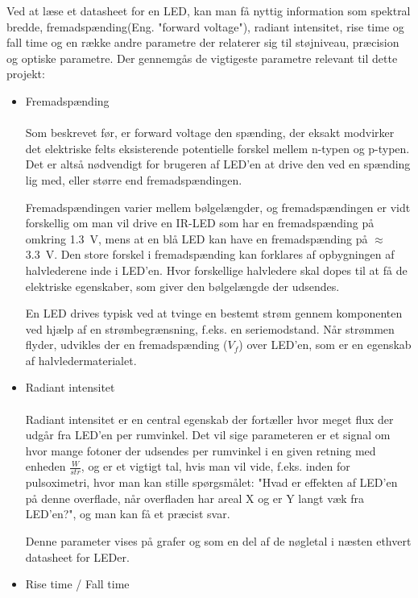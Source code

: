 Ved at læse et datasheet for en LED, kan man få nyttig information som spektral bredde, fremadspænding(Eng. "forward voltage"), radiant intensitet, rise time og fall time og en række andre parametre der relaterer sig til støjniveau, præcision og optiske parametre. Der gennemgås de vigtigeste parametre relevant til dette projekt:


\begin{itemize}
    \item Fremadspænding \\ \\
    Som beskrevet før, er forward voltage den spænding, der eksakt modvirker det elektriske felts eksisterende potentielle forskel mellem n-typen og p-typen. Det er altså nødvendigt for brugeren af LED'en at drive den ved en spænding lig med, eller større end fremadspændingen.

    Fremadspændingen varier mellem bølgelængder, og fremadspændingen er vidt forskellig om man vil drive en IR-LED som har en fremadspænding på omkring \SI{1.3}{V}, mens at en blå LED kan have en fremadspænding på $\approx$ \SI{3.3}{V}. Den store forskel i fremadspænding kan forklares af opbygningen af halvlederene inde i LED'en. Hvor forskellige halvledere skal dopes til at få de elektriske egenskaber, som giver den bølgelængde der udsendes.

    En LED drives typisk ved at tvinge en bestemt strøm gennem komponenten ved hjælp af en strømbegrænsning, f.eks. en seriemodstand. Når strømmen flyder, udvikles der en fremadspænding ($V_f$) over LED'en, som er en egenskab af halvledermaterialet.

    \item Radiant intensitet \\ \\
    Radiant intensitet er en central egenskab der fortæller hvor meget flux der udgår fra LED'en per rumvinkel. Det vil sige parameteren er et signal om hvor mange fotoner der udsendes per rumvinkel i en given retning med enheden $\frac{W}{str}$, og er et vigtigt tal, hvis man vil vide, f.eks. inden for pulsoximetri, hvor man kan stille spørgsmålet: "Hvad er effekten af LED'en på denne overflade, når overfladen har areal X og er Y langt væk fra LED'en?", og man kan få et præcist svar.

    Denne parameter vises på grafer og som en del af de nøgletal i næsten ethvert datasheet for LEDer.

    \item Rise time / Fall time \\


\end{itemize}
